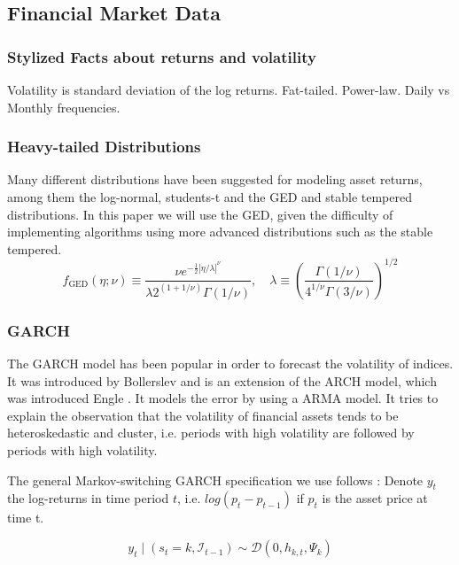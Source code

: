 \documentclass[11pt,a4paper]{article}
\begin{document}
\subsection{Financial Market Data}

\subsubsection{Stylized Facts about returns and volatility}
Volatility is standard deviation of the log returns.
Fat-tailed. Power-law. Daily vs Monthly frequencies. 

\subsubsection{Heavy-tailed Distributions}
Many different distributions have been suggested for modeling asset returns, among them the log-normal, students-t and the \ac{GED} and stable tempered distributions.
In this paper we will use the \ac{GED}, given the difficulty of implementing algorithms using more advanced distributions such as the stable tempered.
$$f_{\mathrm{GED}}(\eta ; \nu) \equiv \frac{\nu e^{-\frac{1}{2}|\eta / \lambda|^\nu}}{\lambda 2^{(1+1 / \nu)} \Gamma(1 / \nu)}, \quad \lambda \equiv\left(\frac{\Gamma(1 / \nu)}{4^{1 / \nu} \Gamma(3 / \nu)}\right)^{1 / 2}$$

\subsubsection{GARCH}
\label{sss:GARCH}
The \ac{GARCH} model has been popular in order to forecast the volatility of indices. It was introduced  by Bollerslev \cite{bollerslev_generalized_1986} and is an extension of the ARCH model, which was introduced Engle \cite{engle_autoregressive_1982}. It models the error by using a \ac{ARMA} model.
It tries to explain the observation that the volatility of financial assets tends to be heteroskedastic and cluster, i.e. periods with high volatility are followed by periods with high volatility.

The general Markov-switching GARCH specification we use follows \cite{ardia_markov-switching_2019}: 
Denote $y_t$ the log-returns in time period $t$, i.e. $log(p_t-p_{t-1})$ if $p_t$ is the asset price at time t.

\begin{equation} \label{eq:msgarch-spec}
	y_{t} \mid\left(s_{t}=k, \mathcal{I}_{t-1}\right) \sim \mathcal{D}\left(0, h_{k, t}, \Psi_{k}\right)
\end{equation}
\end{document}
